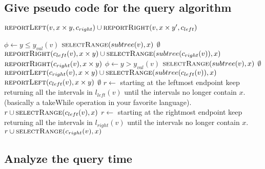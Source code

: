 \documentclass{article}
\begin{document}
\subsection{Give pseudo code for the query algorithm}
\begin{algorithmic}[1]
			\State
			\Return {}
		\EndIf
		\State
		\Return {}
		\EndIf
		\State
		\Return {}
		\EndIf
		\State
		\State
		\Return $\Call{reportLeft}{v, x\times y, c_{right}}\cup
		\Call{reportRight}{v,x\times y', c_{left}}$
	\EndFunction
\end{algorithmic}
\newpage
\begin{algorithmic}[1]
		\State
		$\phi \gets y \leq y_{val}(v)$
			\If{$\phi$}
				\State
				\Return $\Call{selectRange}{subtree(v),x}$
			\EndIf
			\State
			\Return $\emptyset$
		\EndIf
		\If{$\phi$}
		\State
		\Return $\Call{reportRight}{c_{left}(v), x \times y} \cup
		\Call{selectRange}{subtree(c_{right}(v)),x}$
		\EndIf
		\State
		\Return $\Call{reportRight}{c_{right}(v), x \times y}$
	\EndFunction
		\State
		$\phi \gets y > y_{val}(v)$
			\If{$\phi$}
				\State
				\Return $\Call{selectRange}{subtree(v),x}$
			\EndIf
			\State
			\Return $\emptyset$
		\EndIf
		\If{$\phi$}
		\State
		\Return $\Call{reportLeft}{c_{right}(v), x \times y} \cup
		\Call{selectRange}{subtree(c_{left}(v)),x}$
		\EndIf
		\State
		\Return $\Call{reportLeft}{c_{left}(v), x \times y}$
	\EndFunction
		\State
		\Return $\emptyset$
	\EndIf
		\State
		$r \gets $ starting at the leftmost endpoint keep
		returning all the intervals in $l_{left}(v)$ until the
		intervals no longer contain $x$. (basically a takeWhile
		operation in your favorite language).
		\State
		\Return $r \cup \Call{selectRange}{c_{left}(v),x}$
	\EndIf
	\State
	$r \gets $ starting at the rightmost endpoint keep
	returning all the intervals in $l_{right}(v)$ until the
	intervals no longer contain $x$.
	\State
	\Return $r \cup \Call{selectRange}{c_{right}(v),x}$
	\EndFunction
\end{algorithmic}
\subsection{Analyze the query time}
\end{document}
